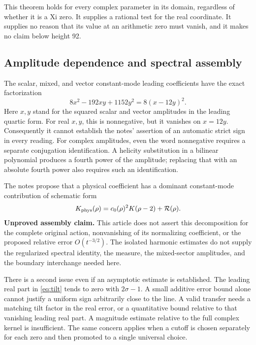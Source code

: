 This theorem holds for every complex parameter in its domain, regardless of whether it is a Xi zero. It supplies a rational test for the real coordinate. It supplies no reason that its value at an arithmetic zero must vanish, and it makes no claim below height 92.

\subsection{Amplitude dependence and spectral assembly}

The scalar, mixed, and vector constant-mode leading coefficients have the exact factorization
\begin{equation}\label{eq:square}
 8x^2-192xy+1152y^2=8(x-12y)^2.
\end{equation}
Here \(x,y\) stand for the squared scalar and vector amplitudes in the leading quartic form.
For real \(x,y\), this is nonnegative, but it vanishes on \(x=12y\). Consequently it cannot establish the notes' assertion of an automatic strict sign in every reading. For complex amplitudes, even the word nonnegative requires a separate conjugation identification. A helicity substitution in a bilinear polynomial produces a fourth power of the amplitude; replacing that with an absolute fourth power also requires such an identification.

The notes propose that a physical coefficient has a dominant constant-mode contribution of schematic form
\[
 K_{\rm phys}(\rho)=c_0(\rho)^2K(\rho-2)+\mathcal R(\rho).
\]
\textbf{Unproved assembly claim.} This article does not assert this decomposition for the complete original action, nonvanishing of its normalizing coefficient, or the proposed relative error \(O(t^{-3/2})\). The isolated harmonic estimates do not supply the regularized spectral identity, the measure, the mixed-sector amplitudes, and the boundary interchange needed here.

There is a second issue even if an asymptotic estimate is established. The leading real part in \eqref{eq:tilt} tends to zero with \(2\sigma-1\). A small additive error bound alone cannot justify a uniform sign arbitrarily close to the line. A valid transfer needs a matching tilt factor in the real error, or a quantitative bound relative to that vanishing leading real part. A magnitude estimate relative to the full complex kernel is insufficient. The same concern applies when a cutoff is chosen separately for each zero and then promoted to a single universal choice.

